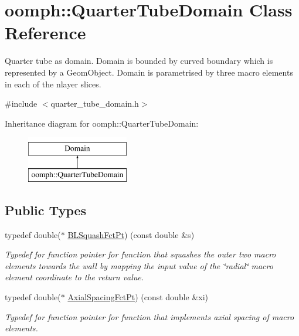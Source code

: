 \hypertarget{classoomph_1_1QuarterTubeDomain}{}\section{oomph\+:\+:Quarter\+Tube\+Domain Class Reference}
\label{classoomph_1_1QuarterTubeDomain}


Quarter tube as domain. Domain is bounded by curved boundary which is represented by a Geom\+Object. Domain is parametrised by three macro elements in each of the nlayer slices.  




{\ttfamily \#include $<$quarter\+\_\+tube\+\_\+domain.\+h$>$}

Inheritance diagram for oomph\+:\+:Quarter\+Tube\+Domain\+:\begin{figure}[H]
\begin{center}
\leavevmode
\includegraphics[height=2.000000cm]{classoomph_1_1QuarterTubeDomain}
\end{center}
\end{figure}
\subsection*{Public Types}
\begin{DoxyCompactItemize}
\item 
typedef double($\ast$ \hyperlink{classoomph_1_1QuarterTubeDomain_a3d8c15c17d9912d8c519c028437c0b2c}{B\+L\+Squash\+Fct\+Pt}) (const double \&s)
\begin{DoxyCompactList}\small\item\em Typedef for function pointer for function that squashes the outer two macro elements towards the wall by mapping the input value of the \char`\"{}radial\char`\"{} macro element coordinate to the return value. \end{DoxyCompactList}\item 
typedef double($\ast$ \hyperlink{classoomph_1_1QuarterTubeDomain_ae347af42a5dcb9b3b82c2247975b01db}{Axial\+Spacing\+Fct\+Pt}) (const double \&xi)
\begin{DoxyCompactList}\small\item\em Typedef for function pointer for function that implements axial spacing of macro elements. \end{DoxyCompactList}\end{DoxyCompactItemize}
